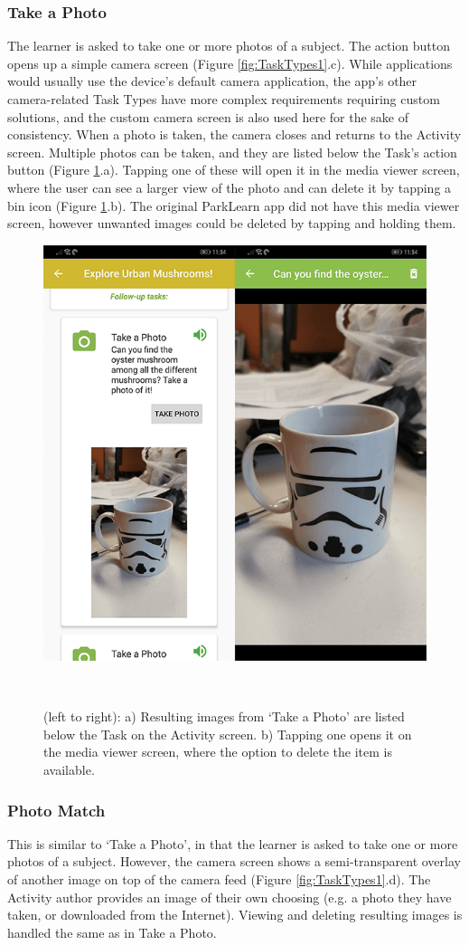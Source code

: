 \subsubsection*{Take a Photo}
The learner is asked to take one or more photos of a subject. The action button opens up a simple camera screen (Figure \ref{fig:TaskTypes1}.c). While applications would usually use the device's default camera application, the app's other camera-related Task Types have more complex requirements requiring custom solutions, and the custom camera screen is also used here for the sake of consistency. When a photo is taken, the camera closes and returns to the Activity screen. Multiple photos can be taken, and they are listed below the Task's action button (Figure \ref{fig:MediaViewer}.a). Tapping one of these will open it in the media viewer screen, where the user can see a larger view of the photo and can delete it by tapping a bin icon (Figure \ref{fig:MediaViewer}.b). The original ParkLearn app did not have this media viewer screen, however unwanted images could be deleted by tapping and holding them.

\begin{figure}
  \centering
  \includegraphics[width=0.65\columnwidth]{images/chapter05/mediaViewer.png}
  \caption[OurPlace's media viewer]{(left to right): a) Resulting images from `Take a Photo' are listed below the Task on the Activity screen. b) Tapping one opens it on the media viewer screen, where the option to delete the item is available.}~\label{fig:MediaViewer}
\end{figure}

\subsubsection*{Photo Match}
This is similar to `Take a Photo', in that the learner is asked to take one or more photos of a subject. However, the camera screen shows a semi-transparent overlay of another image on top of the camera feed (Figure \ref{fig:TaskTypes1}.d). The Activity author provides an image of their own choosing (e.g. a photo they have taken, or downloaded from the Internet). Viewing and deleting resulting images is handled the same as in Take a Photo.

